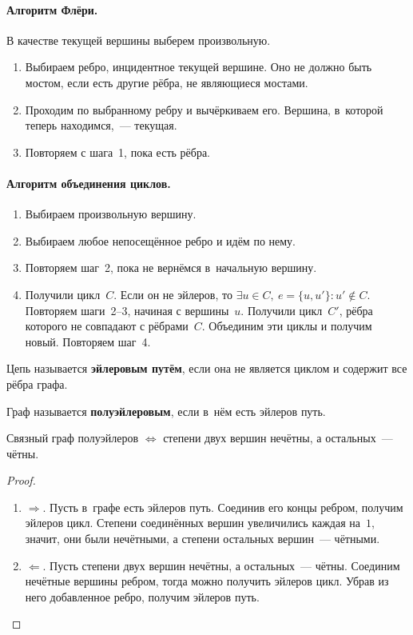\paragraph{Алгоритм Флёри.}
 В качестве текущей вершины выберем произвольную.
\begin{enumerate}
	\item Выбираем ребро, инцидентное текущей вершине.
	Оно не должно быть мостом, если есть другие рёбра, не являющиеся мостами.
	\item Проходим по выбранному ребру и вычёркиваем его.
	Вершина, в~которой теперь находимся,~--- текущая.
	\item Повторяем с шага~1, пока есть рёбра.
\end{enumerate}

\paragraph{Алгоритм объединения циклов.}
\begin{enumerate}
	\item Выбираем произвольную вершину.
	\item Выбираем любое непосещённое ребро и идём по нему.
	\item Повторяем шаг~2, пока не вернёмся в~начальную вершину.
	\item Получили цикл~$C$.
	Если он не эйлеров, то $\exists u \in C, \ e = \{ u, u' \} \colon u' \notin C$.
	Повторяем шаги~2--3, начиная с вершины~$u$.
	Получили цикл~$C'$, рёбра которого не совпадают с рёбрами~$C$.
	Объединим эти циклы и получим новый.
	Повторяем шаг~4.
\end{enumerate}

Цепь называется \textbf{эйлеровым путём}, если она не является циклом и содержит все рёбра графа.

 Граф называется \textbf{полуэйлеровым}, если в~нём есть эйлеров путь.

\begin{theorem}
Связный граф полуэйлеров $\Leftrightarrow$ степени двух вершин нечётны, а остальных~--- чётны.
\end{theorem}
\begin{proof}
\begin{enumerate}
	\item $\Rightarrow$. Пусть в~графе есть эйлеров путь.
	Соединив его концы ребром, получим эйлеров цикл.
	Степени соединённых вершин увеличились каждая на~$1$, значит, они были нечётными, а степени остальных вершин~--- чётными.
	\item $\Leftarrow$. Пусть степени двух вершин нечётны, а остальных~--- чётны.
	Соединим нечётные вершины ребром, тогда можно получить эйлеров цикл.
	Убрав из него добавленное ребро, получим эйлеров путь.
\end{enumerate}
\end{proof}

